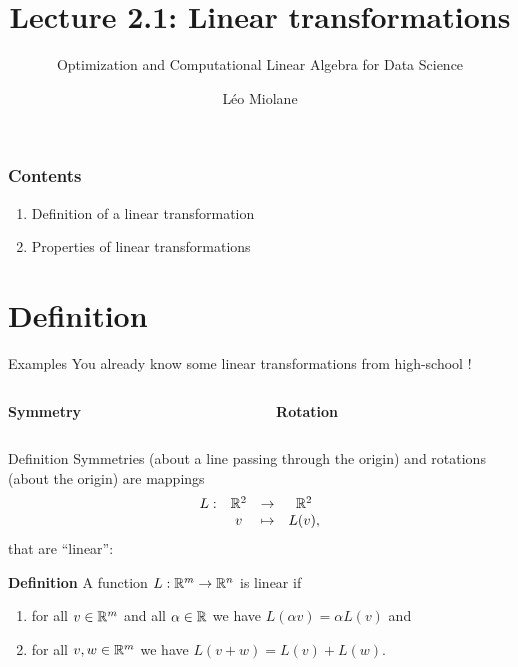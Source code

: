 \documentclass{beamer}
\title{Lecture 2.1: Linear transformations}
\subtitle{Optimization and Computational Linear Algebra for Data Science}
\author{Léo Miolane}
\date{}
\begin{document}
\setcounter{showProgressBar}{0}
\setcounter{showSlideNumbers}{0}

\frame{\titlepage}

\begin{frame}
	\frametitle{Contents}
	\begin{enumerate}
		\item Definition of a linear transformation
		\item Properties of linear transformations
	\end{enumerate}
\end{frame}


\setcounter{framenumber}{0}
\setcounter{showSlideNumbers}{1}
\section{Definition}
\begin{frame}[t]{Examples}
	You already know some linear transformations from high-school !

	\vspace{0.6cm}
	\begin{columns}
		\begin{column}{0.47\textwidth}
			\vspace{-0.25cm}
			\begin{center}
				\textbf{Symmetry}
			\end{center}
			\vspace{5cm}
		\end{column}
		\vrule
		\vrule
		\begin{column}{0.53\textwidth}
			\vspace{-0.5cm}
			\begin{center}
				\textbf{Rotation}
				\vspace{5cm}
			\end{center}
		\end{column}
	\end{columns}


\end{frame}

\begin{frame}[t]{Definition}
	Symmetries (about a line passing through the origin) and rotations (about the origin) are mappings
	$$
	\begin{array}{cccc}
		L: & \mathbb{R}^2 & \to & \mathbb{R}^2 \\
		   & v & \mapsto & L(v),
	\end{array}
	$$
	that are ``linear'':
	\vspace{0.3cm}
	\begin{block}{\bf Definition}
		A function $L: \mathbb{R}^m \to \mathbb{R}^n$ is linear if
		\begin{enumerate}
			\item for all $v \in \mathbb{R}^m$ and all $\alpha \in \mathbb{R}$ we have $L(\alpha v) = \alpha L(v)$ and
			\item for all $v,w \in \mathbb{R}^m$ we have $L(v + w) = L(v) + L(w)$.
		\end{enumerate}
	\end{block}
\end{frame}
\end{document}
